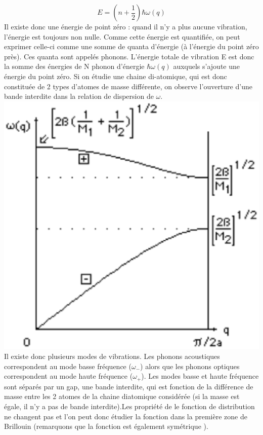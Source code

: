 \begin{equation}
E=(n+\frac{1}{2})\hbar \omega(q)
\end{equation}
Il existe donc une énergie de point zéro : quand il n'y a plus aucune vibration, l'énergie est toujours non nulle. Comme cette énergie est quantifiée, on peut exprimer celle-ci comme une somme de quanta d'énergie (à l'énergie du point zéro près). Ces quanta sont appelés phonons. L'énergie totale de vibration E est donc la somme des énergies de N phonon d'énergie $ \hbar \omega(q) $ auxquels s'ajoute une énergie du point zéro. 
Si on étudie une chaine di-atomique, qui est donc constituée de 2 types d'atomes de masse différente, on observe l'ouverture d'une bande interdite dans la relation de dispersion de $\omega$.
\\ \includegraphics[scale=0.4]{wdis2.eps} \\
Il existe donc plusieurs modes de vibrations. Les phonons acoustiques correspondent au mode basse fréquence ($\omega_-$) alors que les phonons optiques correspondent au mode haute fréquence ($\omega_+$). Les modes basse et haute fréquence sont séparés par un gap, une bande interdite, qui est fonction de la différence de masse entre les 2 atomes de la chaine diatomique considérée (si la masse est égale, il n'y a pas de bande interdite).Les propriété de le fonction de distribution ne changent pas et l'on peut donc étudier la fonction dans la première zone de Brillouin (remarquons que la fonction est également symétrique ).\\
